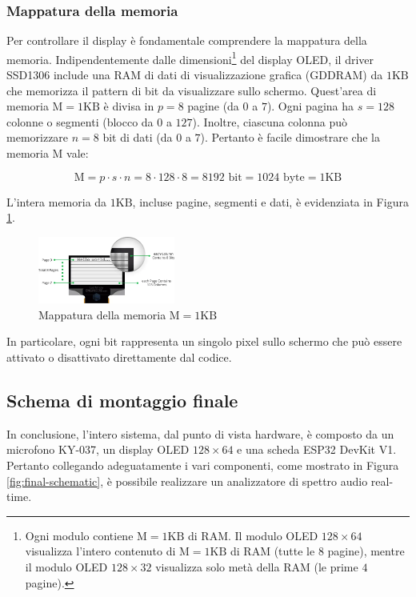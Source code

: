 \documentclass[a4paper,12pt]{report}  %
\begin{document}
\subsubsection{Mappatura della memoria}
Per controllare il display è fondamentale comprendere la mappatura della memoria.
Indipendentemente dalle dimensioni\footnote{Ogni modulo contiene $\text{M} = 1 \text{KB}$ di RAM. Il modulo OLED $128 \times 64$ visualizza l'intero contenuto di $\text{M} = 1 \text{KB}$ di RAM (tutte le $8$ pagine), mentre il modulo OLED $128 \times 32$ visualizza solo metà della RAM (le prime $4$ pagine).} del display OLED, il driver SSD1306 include una RAM di dati di visualizzazione graﬁca (GDDRAM) da $1 \text{KB}$ che memorizza il pattern di bit da visualizzare sullo schermo.
Quest'area di memoria $\text{M} = 1 \text{KB}$ è divisa in $p = 8$ pagine (da $0$ a $7$).
Ogni pagina ha $s = 128$ colonne o segmenti (blocco da $0$ a $127$).
Inoltre, ciascuna colonna può memorizzare $n = 8$ bit di dati (da $0$ a $7$).
Pertanto è facile dimostrare che la memoria $\text{M}$ vale:

\begin{equation}
    \text{M} = p \cdot s \cdot n = 8 \cdot 128 \cdot 8 = 8192 \text{ bit} = 1024 \text{ byte} = 1 \text{KB} \nonumber
\end{equation}

L'intera memoria da $1 \text{KB}$, incluse pagine, segmenti e dati, è evidenziata in Figura \ref{fig:memory-mapping}.

\begin{figure}[h]
    \centering
    \includegraphics[width=0.4\textwidth]{imgs/1KB-128x64-OLED-Display-RAM-Memory-Map.png}
    \caption{Mappatura della memoria $\text{M} = 1 \text{KB}$}
    \label{fig:memory-mapping}
\end{figure}

In particolare, ogni bit rappresenta un singolo pixel sullo schermo che può essere attivato o disattivato direttamente dal codice.

\subsection{Schema di montaggio finale}
In conclusione, l'intero sistema, dal punto di vista hardware, è composto da un microfono KY-037, un display OLED $128 \times 64$ e una scheda ESP32 DevKit V1.
Pertanto collegando adeguatamente i vari componenti, come mostrato in Figura \ref{fig:final-schematic}, è possibile realizzare un analizzatore di spettro audio real-time.
\end{document}
